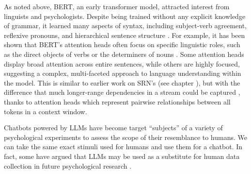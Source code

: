 
As noted above, BERT, an early transformer model, attracted interest from
linguists and psychologists. Despite being trained without any explicit
knowledge of grammar, it learned many aspects of syntax, including subject-verb
agreement, reflexive pronouns, and hierarchical sentence structure
\cite{goldberg2019assessing, linzen2021syntactic, tenney2019bert}. For example,
it has been shown that BERT's attention heads often focus on specific
linguistic roles, such as the direct objects of verbs or the determiners of
nouns \cite{clark2019does}. Some attention heads display broad attention across
entire sentences, while others are highly focused, suggesting a complex,
multi-faceted approach to language understanding within the model. This is
similar to earlier work on SRN's (see chapter
), but with the difference that much
longer-range dependencies in a stream could be captured
\cite{mcclelland2020placing}, thanks to attention heads which represent
pairwise relationships between all tokens in a context window. 

Chatbots powered by LLMs have become target ``subjects'' of a variety of
psychological experiments to assess the scope of their resemblance to humans.
We can take the same exact stimuli used for humans and use them for a chatbot.
In fact, some have argued that LLMs may be used as a substitute for human data
collection in future psychological research \cite{aher2023using,
dillion2023can}.

